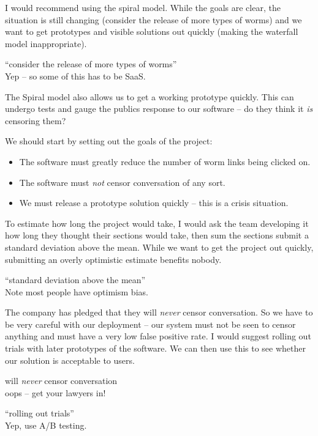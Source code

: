 \documentclass[10pt,\jkfside,a4paper]{article}
\begin{document}
\begin{enumerate}
\begin{enumerate}[label=(\alph*)]
I would recommend using the spiral model. While the goals are clear, the situation is
still changing (consider the release of more types of worms) and we want to get prototypes
and visible solutions out quickly (making the waterfall model inappropriate).

{\color{blue}
``consider the release of more types of worms''\\
Yep -- so some of this has to be SaaS.
}

The Spiral model also allows us to get a working prototype quickly. This can undergo tests and
gauge the publics response to our software -- do they think it \textit{is} censoring them?

We should start by setting out the goals of the project:

\begin{itemize}

\item The software must greatly reduce the number of worm links being clicked on.

\item The software must \textit{not} censor conversation of any sort.

\item We must release a prototype solution quickly -- this is a crisis situation.

\end{itemize}

To estimate how long the project would take, I would ask the team developing it how long they
thought their sections would take, then sum the sections submit a standard deviation above the mean. While we
want to get the project out quickly, submitting an overly optimistic estimate benefits nobody.

{\color{blue}
``standard deviation above the mean''\\
Note most people have optimism bias.
}

The company has pledged that they will \textit{never} censor conversation.
So we have to be very careful with our deployment -- our system must not be seen
to censor anything and must have a very low false positive rate. I would suggest
rolling out trials with later prototypes of the software. We can then use this to see whether
our solution is acceptable to users.

{\color{blue}
will \textit{never} censor conversation\\
oops -- get your lawyers in!
}

{\color{blue}
``rolling out trials''\\
Yep, use A/B testing.
}


\end{enumerate}
\end{enumerate}
\end{document}
